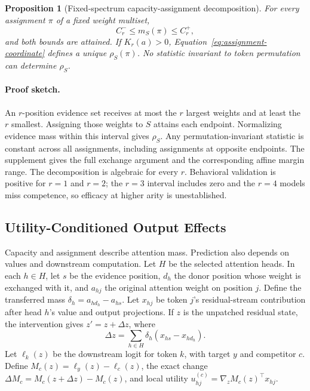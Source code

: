 \documentclass[letterpaper]{article} %
\newtheorem{proposition}{Proposition}
\begin{document}
\begin{center}
\end{center}

\begin{proposition}[Fixed-spectrum capacity-assignment decomposition]
For every assignment $\pi$ of a fixed weight multiset,
\begin{equation}
 C_r^-\le m_S(\pi)\le C_r^+,
\end{equation}
and both bounds are attained. If $K_r(a)>0$, Equation~\ref{eq:assignment-coordinate} defines a unique
$\rho_S(\pi)$. No statistic invariant to token permutation can determine $\rho_S$.
\label{prop:capacity}
\end{proposition}

\paragraph{Proof sketch.}
An $r$-position evidence set receives at most the $r$ largest weights and at least the $r$ smallest. Assigning
those weights to $S$ attains each endpoint. Normalizing evidence mass within this interval gives $\rho_S$.
Any permutation-invariant statistic is constant across all assignments, including assignments at opposite
endpoints. The supplement gives the full exchange argument and the corresponding affine margin range.
The decomposition is algebraic for every $r$. Behavioral validation is positive for $r=1$ and $r=2$; the
$r=3$ interval includes zero and the $r=4$ models miss competence, so efficacy at higher arity is unestablished.

\subsection{Utility-Conditioned Output Effects}

Capacity and assignment describe attention mass. Prediction also depends on values and downstream
computation. Let $H$ be the selected attention heads. In each $h\in H$, let $s$ be the evidence position,
$d_h$ the donor position whose weight is exchanged with it, and $a_{hj}$ the original attention weight on
position $j$. Define the transferred mass $\delta_h=a_{h d_h}-a_{h s}$. Let $x_{hj}$ be token $j$'s
residual-stream contribution after head $h$'s value and output projections. If $z$ is the unpatched residual
state, the intervention gives $z'=z+\Delta z$, where
\begin{equation}
 \Delta z=\sum_{h\in H}\delta_h(x_{hs}-x_{hd_h}).
\label{eq:residual-change}
\end{equation}
Let $\ell_k(z)$ be the downstream logit for token $k$, with target $y$ and competitor $c$. Define
$M_c(z)=\ell_y(z)-\ell_c(z)$, the exact change $\Delta M_c=M_c(z+\Delta z)-M_c(z)$, and local utility
$u_{hj}^{(c)}=\nabla_z M_c(z)^\top x_{hj}$.
\end{document}
